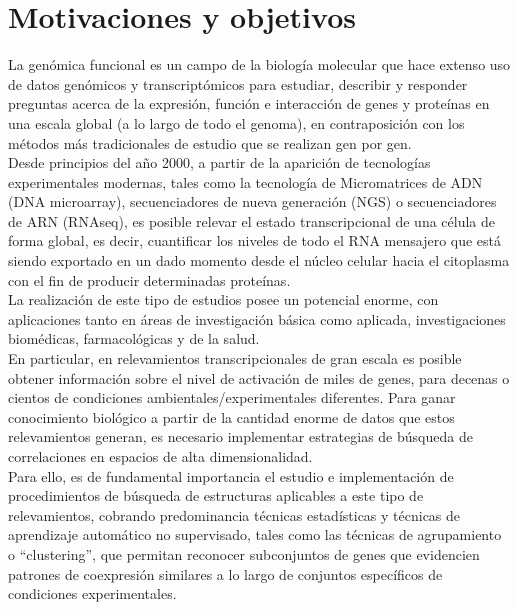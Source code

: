 \chapter*{Motivaciones y objetivos}
La genómica funcional es un campo de la biología molecular que hace extenso uso de datos genómicos y transcriptómicos para estudiar, describir y responder preguntas acerca de la expresión, función e interacción de genes y proteínas en una escala global (a lo largo de todo el genoma), en contraposición con los métodos más tradicionales de estudio que se realizan gen por gen.\\
Desde principios del año 2000, a partir de la aparición de tecnologías experimentales modernas, tales como la tecnología de Micromatrices de ADN (DNA microarray), secuenciadores de nueva generación (NGS) o secuenciadores de ARN (RNAseq), es posible relevar el estado transcripcional de una célula de forma global, es decir, cuantificar los niveles de todo el RNA mensajero que está siendo exportado en un dado momento desde el núcleo celular hacia el citoplasma con el fin de producir determinadas proteínas.\\
La realización de este tipo de estudios posee un potencial enorme, con aplicaciones tanto en áreas de investigación básica como aplicada, investigaciones biomédicas, farmacológicas y de la salud.\\
En particular, en relevamientos transcripcionales de gran escala es posible obtener información sobre el nivel de activación de miles de genes, para decenas o cientos de condiciones ambientales/experimentales diferentes. Para ganar conocimiento biológico a partir de la cantidad enorme de datos que estos relevamientos generan, es necesario implementar estrategias de búsqueda de correlaciones en espacios de alta dimensionalidad.\\
Para ello, es de fundamental importancia el estudio e implementación de procedimientos de búsqueda de estructuras aplicables a este tipo de relevamientos, cobrando predominancia técnicas estadísticas y técnicas de aprendizaje automático no supervisado, tales como las técnicas de agrupamiento o ``clustering'', que permitan reconocer subconjuntos de genes que evidencien patrones de coexpresión similares a lo largo de conjuntos específicos de condiciones experimentales.\cite{functional_genomics_definition_nature, functional_genomics_definition_wikipedia}

